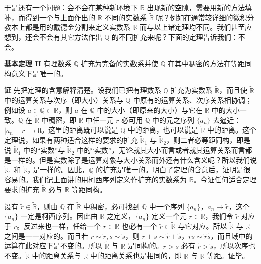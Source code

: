 于是还有一个问题：会不会在某种新环境下 $\mathbb R$ 出现新的空隙，需要用新的方法填补，而得到一个与上面作出的 $\mathbb R$ 不同的实数系 $\widetilde{\mathbb R}$ 呢？例如在通常较详细的微积分教本上都是用的戴德金分割来定义实数系 $\mathbb R$ 而与以上诸定理均不同。我们甚至应想到，还会不会有其它方法作出 $\mathbb Q$ 的不同扩充来呢？下面的定理告诉我们：不会。

\noindent\textbf{基本定理 II}\quad
有理数系 $\mathbb Q$ 扩充为完备的实数系并使 $\mathbb Q$ 在其中稠密的方法在等距同构意义下是唯一的。

\noindent\textbf{证}\quad
先把定理的含意解释清楚。设我们已把有理数系 $\mathbb Q$ 扩充为实数系 $\widetilde{\mathbb R}$，而且使 $\widetilde{\mathbb R}$ 中的运算关系与次序（即大小）关系与 $\mathbb Q$ 中原有的运算关系、次序关系相协调；例如设 $a\in\mathbb Q\subset\widetilde{\mathbb R}$，则 $a$ 在 $\mathbb Q$ 中的大小（即原来的大小）与它在 $\widetilde{\mathbb R}$ 中的大小一致。$\mathbb Q$ 在 $\widetilde{\mathbb R}$ 中稠密，即 $\widetilde{\mathbb R}$ 中任一元 $r$ 必可用 $\mathbb Q$ 中的元之序列 $\{a_n\}$ 去逼近：$|a_n-r|\to0$。这里的距离既可以说是 $\mathbb Q$ 中的距离，也可以说是 $\widetilde{\mathbb R}$ 中的距离。这个定理说，如果有两种适合这样的要求的扩充 $\widetilde{\mathbb R}_1$ 与 $\widetilde{\mathbb R}_2$，则二者必等距同构，即是说 $\widetilde{\mathbb R}_1$ 中的“实数”与 $\widetilde{\mathbb R}_2$ 中的“实数”，无论就其大小而言或者就其运算关系而言都是一样的。但是实数除了是运算对象与大小关系而外还有什么含义呢？所以我们说 $\widetilde{\mathbb R}_1$ 和 $\widetilde{\mathbb R}_2$ 是一样的。因此，$\mathbb Q$ 的扩充是唯一的。明白了定理的含意后，证明是很容易的。我们记上面讲的用柯西序列定义作扩充的实数系为 $\mathbb R$。今证任何适合定理要求的扩充 $\widetilde{\mathbb R}$ 必与 $\mathbb R$ 等距同构。

设有 $\tilde r\in\widetilde{\mathbb R}$，则由 $\mathbb Q$ 在 $\widetilde{\mathbb R}$ 中稠密，必可找到 $\mathbb Q$ 中一个序列 $\{a_n\}$，$a_n\to\tilde r$，这个 $\{a_n\}$ 一定是柯西序列。因此由 $\mathbb R$ 之定义，$\{a_n\}$ 定义一个元 $r\in\mathbb R$，我们令 $\tilde r$ 对应于 $r$。反过来也一样，任给一个 $r\in\mathbb R$ 也必有一个 $\tilde r\in\widetilde{\mathbb R}$ 与它对应。所以 $\widetilde{\mathbb R}$ 与 $\mathbb R$ 之间是一一对应的。而且若 $r\sim\tilde r,s\sim\tilde s$，则 $r+s\sim\tilde r+\tilde s$，$rs\sim\tilde r\tilde s$，而且域中的运算在此对应下是不变的。所以 $\widetilde{\mathbb R}$ 与 $\mathbb R$ 是同构的。$r>s$ 必有 $\tilde r>\tilde s$，所以次序也不变。$\widetilde{\mathbb R}$ 中的距离关系与 $\mathbb R$ 中的距离关系也是相同的，即 $\widetilde{\mathbb R}$ 与 $\mathbb R$ 等距。证毕。

